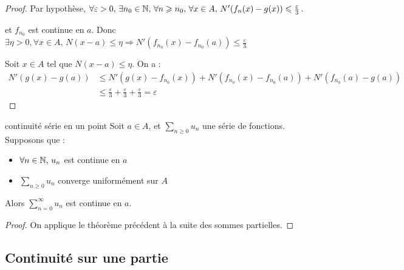 \begin{proof}
    Par hypothèse, $\forall \varepsilon > 0, \, \exists n_0 \in \mathbb{N}, \, \forall n \geqslant n_0, \, \forall x \in A, \, N'(f_n(x) - g(x)) \leqslant \frac \varepsilon 3$.

    et $f_{n_0}$ est continue en $a$. Donc $\exists \eta > 0, \forall x \in A, \, N(x - a) \leqslant \eta \Rightarrow N'(f_{n_0}(x) - f_{n_0}(a)) \leqslant \frac \varepsilon 3$

    Soit $x \in A$ tel que $N(x - a) \leqslant \eta$. On a :
    \begin{align}
        N'(g(x) - g(a)) & \leqslant N'(g(x) - f_{n_0}(x)) + N'(f_{n_0}(x) - f_{n_0}(a)) + N'(f_{n_0}(a) - g(a)) \\
        & \leqslant \frac \varepsilon 3 + \frac \varepsilon 3 + \frac \varepsilon 3 = \varepsilon
    \end{align}
\end{proof}

\begin{theoreme}{continuité série en un point}{}
    Soit $a \in A$, et $\displaystyle \sum_{n \geqslant 0} u_n$ une série de fonctions. Supposons que : 
    \begin{itemize}
        \item $\forall n \in \mathbb{N}, \, u_n$ est continue en $a$
        \item $\displaystyle \sum_{n \geqslant 0} u_n$ converge uniformément sur $A$ 
    \end{itemize}
    Alors $\displaystyle \sum_{n = 0}^{\infty} u_n$ est continue en $a$.
\end{theoreme}

\begin{proof}
    On applique le théorème précédent à la suite des sommes partielles.
\end{proof}

\subsection{Continuité sur une partie }

